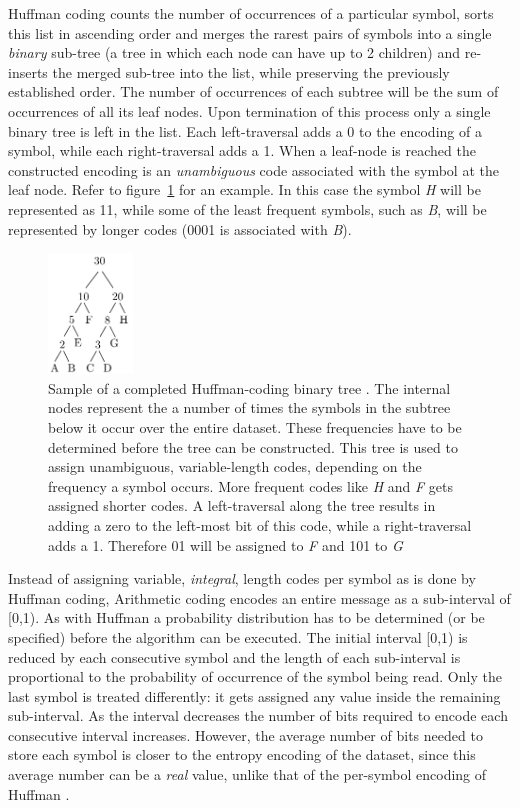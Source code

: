 Huffman coding counts the number of occurrences of a particular symbol, sorts this list in ascending order and merges the rarest pairs of symbols into a single \textit{binary} 
sub-tree (a tree in which each node can have up to 2 children) and re-inserts the merged sub-tree into the list, while preserving the previously established order. The number of occurrences 
of each subtree will be the sum of occurrences of all its leaf nodes. Upon termination of this process only a single binary tree is left in the list. Each left-traversal adds a 0 to the encoding 
of a symbol, while each right-traversal adds a 1. When a leaf-node is reached the constructed encoding is an \textit{unambiguous} code associated with the symbol at the leaf node. Refer to figure~\ref{HUFFMAN} for an example.
In this case the symbol \textit{H} will be represented as 11, while some of the least frequent symbols, such as \textit{B}, will be represented by longer codes (0001 is associated with \textit{B}).
\begin{figure}[h!]
\begin{mdframed}
 \centering
 \includegraphics[width=0.2\textwidth]{huffmanTree.png}
 \caption{Sample of a completed Huffman-coding binary tree \cite[p. 70]{salomon2004data}. The internal nodes represent the a number of times the symbols in the subtree below it occur over the entire
 dataset. These frequencies have to be determined before the tree can be constructed. This tree is used to assign unambiguous, variable-length codes, depending on the frequency a symbol occurs.
 More frequent codes like \textit{H} and \textit{F} gets assigned shorter codes. A left-traversal along the tree results in adding a zero to the left-most bit of this code, while a right-traversal
 adds a 1. Therefore 01 will be assigned to \textit{F} and 101 to \textit{G}}
 \label{HUFFMAN}
\end{mdframed}
\end{figure}

Instead of assigning variable, \textit{integral}, length codes per symbol as is done by Huffman coding, Arithmetic coding encodes an entire message as a sub-interval of [0,1). As with
Huffman a probability distribution has to be determined (or be specified) before the algorithm can be executed. The initial interval [0,1) is reduced by each consecutive 
symbol and the length of each sub-interval is proportional to the probability of occurrence of the symbol being read. Only the last symbol is treated differently: it gets assigned any value inside the remaining 
sub-interval. As the interval decreases the number of bits required to encode each consecutive interval increases. However, the average number of bits needed to store 
each symbol is closer to the entropy encoding of the dataset, since this average number can be a \textit{real} value, unlike that of the per-symbol encoding of Huffman \cite[ch. 2]{salomon2004data}.

